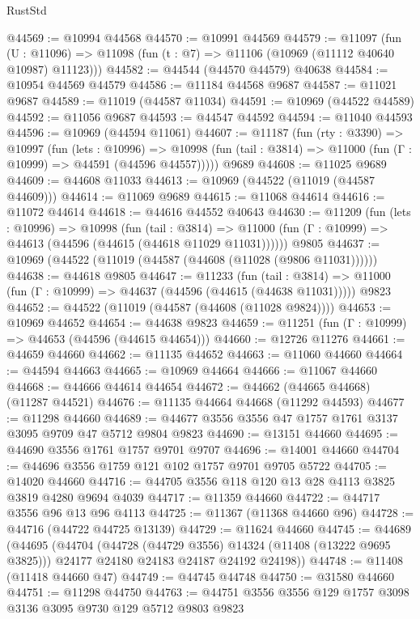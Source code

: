 \begin{lexlean}{RustStd}
\begin{coremodule}
@44569 := @10994 @44568
@44570 := @10991 @44569
@44579 := @11097
    (fun (U : @11096) => @11098 (fun (t : @7) => @11106 (@10969 (@11112 @40640 @10987) @11123)))
@44582 := @44544 (@44570 @44579) @40638
@44584 := @10954 @44569 @44579
@44586 := @11184 @44568 @9687
@44587 := @11021 @9687
@44589 := @11019 (@44587 @11034)
@44591 := @10969 (@44522 @44589)
@44592 := @11056 @9687
@44593 := @44547 @44592
@44594 := @11040 @44593
@44596 := @10969 (@44594 @11061)
@44607 := @11187
    (fun (rty : @3390) =>
    @10997
      (fun (lets : @10996) =>
      @10998 (fun (tail : @3814) => @11000 (fun (Γ : @10999) => @44591 (@44596 @44557)))))
    @9689
@44608 := @11025 @9689
@44609 := @44608 @11033
@44613 := @10969 (@44522 (@11019 (@44587 @44609)))
@44614 := @11069 @9689
@44615 := @11068 @44614
@44616 := @11072 @44614
@44618 := @44616 @44552 @40643
@44630 := @11209
    (fun (lets : @10996) =>
    @10998
      (fun (tail : @3814) =>
      @11000 (fun (Γ : @10999) => @44613 (@44596 (@44615 (@44618 @11029 @11031))))))
    @9805
@44637 := @10969 (@44522 (@11019 (@44587 (@44608 (@11028 (@9806 @11031))))))
@44638 := @44618 @9805
@44647 := @11233
    (fun (tail : @3814) => @11000 (fun (Γ : @10999) => @44637 (@44596 (@44615 (@44638 @11031)))))
    @9823
@44652 := @44522 (@11019 (@44587 (@44608 (@11028 @9824))))
@44653 := @10969 @44652
@44654 := @44638 @9823
@44659 := @11251 (fun (Γ : @10999) => @44653 (@44596 (@44615 @44654)))
@44660 := @12726 @11276
@44661 := @44659 @44660
@44662 := @11135 @44652
@44663 := @11060 @44660
@44664 := @44594 @44663
@44665 := @10969 @44664
@44666 := @11067 @44660
@44668 := @44666 @44614 @44654
@44672 := @44662 (@44665 @44668) (@11287 @44521)
@44676 := @11135 @44664 @44668 (@11292 @44593)
@44677 := @11298 @44660
@44689 := @44677 @3556 @3556 @47 @1757 @1761 @3137 @3095 @9709 @47 @5712 @9804 @9823
@44690 := @13151 @44660
@44695 := @44690 @3556 @1761 @1757 @9701 @9707
@44696 := @14001 @44660
@44704 := @44696 @3556 @1759 @121 @102 @1757 @9701 @9705 @5722
@44705 := @14020 @44660
@44716 := @44705 @3556 @118 @120 @13 @28 @4113 @3825 @3819 @4280 @9694 @4039
@44717 := @11359 @44660
@44722 := @44717 @3556 @96 @13 @96 @4113
@44725 := @11367 (@11368 @44660 @96)
@44728 := @44716 (@44722 @44725 @13139)
@44729 := @11624 @44660
@44745 := @44689
    (@44695
      (@44704
        (@44728 (@44729 @3556) @14324 (@11408 (@13222 @9695 @3825)))
        @24177
        @24180
        @24183
        @24187
        @24192
        @24198))
@44748 := @11408 (@11418 @44660 @47)
@44749 := @44745 @44748
@44750 := @31580 @44660
@44751 := @11298 @44750
@44763 := @44751 @3556 @3556 @129 @1757 @3098 @3136 @3095 @9730 @129 @5712 @9803 @9823

\end{coremodule}
\end{lexlean}
